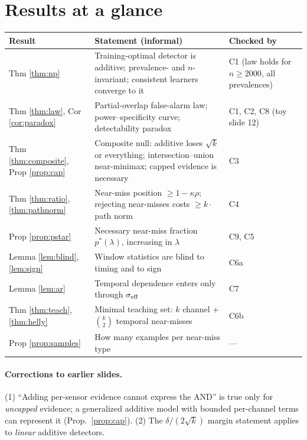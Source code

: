 \documentclass[11pt]{article}
\theoremstyle{definition}
\theoremstyle{remark}
\newcommand{\1}{\mathbf{1}}
\begin{document}
\section{Results at a glance}
\begin{center}
\small
\begin{tabular}{p{4.3cm}p{6.2cm}p{4.2cm}}
\toprule
Result & Statement (informal) & Checked by \\
\midrule
Thm \ref{thm:np} & Training-optimal detector is additive; prevalence- and $n$-invariant; consistent learners converge to it & C1 (law holds for $n\ge 2000$, all prevalences) \\
Thm \ref{thm:law}, Cor \ref{cor:paradox} & Partial-overlap false-alarm law; power--specificity curve; detectability paradox & C1, C2, C8 (toy slide 12) \\
Thm \ref{thm:composite}, Prop \ref{prop:cap} & Composite null: additive loses $\sqrt{k}$ or everything; intersection--union near-minimax; capped evidence is necessary & C3 \\
Thm \ref{thm:ratio}, \ref{thm:pathnorm} & Near-miss position $\ge 1-\kappa\rho$; rejecting near-misses costs $\ge k\cdot$ path norm & C4 \\
Prop \ref{prop:pstar} & Necessary near-miss fraction $p^*(\lambda)$, increasing in $\lambda$ & C9, C5 \\
Lemma \ref{lem:blind}, \ref{lem:sign} & Window statistics are blind to timing and to sign & C6a \\
Lemma \ref{lem:ar} & Temporal dependence enters only through $\sigma_{\rm eff}$ & C7 \\
Thm \ref{thm:teach}, \ref{thm:helly} & Minimal teaching set: $k$ channel + $\binom{k}{2}$ temporal near-misses & C6b \\
Prop \ref{prop:samples} & How many examples per near-miss type & --- \\
\bottomrule
\end{tabular}
\end{center}

\paragraph{Corrections to earlier slides.} (1) ``Adding per-sensor evidence cannot express the AND'' is true only for \emph{uncapped} evidence; a generalized additive model with bounded per-channel terms can represent it (Prop.~\ref{prop:cap}). (2) The $\delta/(2\sqrt{k})$ margin statement applies to \emph{linear} additive detectors.
\end{document}
